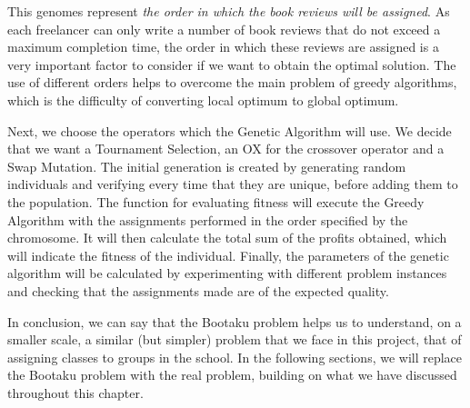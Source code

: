 This genomes represent \textit{the order in which the book reviews will be assigned}. As each freelancer can only write a number of book reviews that do not exceed a maximum completion time, the order in which these reviews are assigned is a very important factor to consider if we want to obtain the optimal solution. The use of different orders helps to overcome the main problem of greedy algorithms, which is the difficulty of converting local optimum to global optimum.

Next, we choose the operators which the Genetic Algorithm will use. We decide that we want a Tournament Selection, an OX for the crossover operator and a Swap Mutation. The initial generation is created by generating random individuals and verifying every time that they are unique, before adding them to the population. The function for evaluating fitness will execute the Greedy Algorithm with the assignments performed in the order specified by the chromosome. It will then calculate the total sum of the profits obtained, which will indicate the fitness of the individual. Finally, the parameters of the genetic algorithm will be calculated by experimenting with different problem instances and checking that the assignments made are of the expected quality.

In conclusion, we can say that the Bootaku problem helps us to understand, on a smaller scale, a similar (but simpler) problem that we face in this project, that of assigning classes to groups in the school. In the following sections, we will replace the Bootaku problem with the real problem, building on what we have discussed throughout this chapter.


